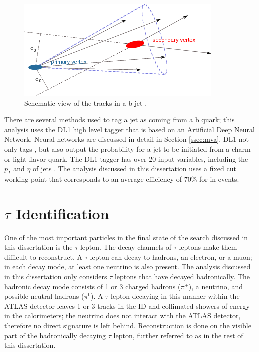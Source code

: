 			\begin{figure}[!ht]
			\centering
			\includegraphics[width=.5\textwidth,keepaspectratio=true]{chapters/chapter5_eventreconnstruction/images/b-jet-schetch.png}
			\caption{\label{fig:bjet} Schematic view of the tracks in a b-jet \cite{bjet-trigger}.}
			\end{figure}

		There are several methods used to tag a jet as coming from a b quark; this analysis uses the DL1 high level tagger \cite{b-tagging} that is based on an Artificial Deep Neural Network. Neural networks are discussed in detail in Section \ref{ssec:mva}. DL1 not only tags \bjets, but also output the probability for a jet to be initiated from a charm or light flavor quark. The DL1 tagger has over 20 input variables, including the $p_{T}$ and $\eta$ of jets \cite{b-tagging-input-variables}. The analysis discussed in this dissertation uses a fixed cut working point that corresponds to an average efficiency of 70\% for \bjets in \ttbar events.


	\section{$\tau$ Identification}\label{ssec:reco-tau}
	One of the most important particles in the final state of the search discussed in this dissertation is the $\tau$ lepton. The decay channels of $\tau$ leptons make them difficult to reconstruct. A $\tau$ lepton can decay to hadrons, an electron, or a muon; in each decay mode, at least one neutrino is also present. The analysis discussed in this dissertation only considers $\tau$ leptons that have decayed hadronically. The hadronic decay mode consists of 1 or 3 charged hadrons ($\pi^{\pm}$), a neutrino, and possible neutral hadrons ($\pi^0$). A $\tau$ lepton decaying in this manner within the ATLAS detector leaves 1 or 3 tracks in the ID and collimated showers of energy in the calorimeters; the neutrino does not interact with the ATLAS detector, therefore no direct signature is left behind. Reconstruction is done on the visible part of the hadronically decaying $\tau$ lepton, further referred to as \tauhad in the rest of this dissertation. 

